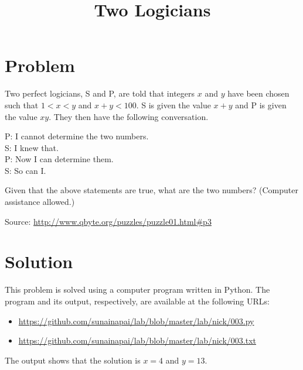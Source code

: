 \documentclass{article}
\title{Two Logicians}
\begin{document}
\maketitle

\section*{Problem}
Two perfect logicians, S and P, are told that integers \( x \) and \( y \)
have been chosen such that \( 1 < x < y \) and \( x + y < 100 \). S is
given the value \( x + y \) and P is given the value \( xy \). They then
have the following conversation.


\setlength{\leftskip}{2em}
P:  I cannot determine the two numbers. \\
S:  I knew that. \\
P:  Now I can determine them. \\
S:  So can I.

\setlength{\leftskip}{0em}

Given that the above statements are true, what are the two numbers?
(Computer assistance allowed.)

Source: \url{http://www.qbyte.org/puzzles/puzzle01.html#p3}

\section*{Solution}
This problem is solved using a computer program written in Python. The
program and its output, respectively, are available at the following
URLs:
\begin{itemize}
\item \url{https://github.com/sunainapai/lab/blob/master/lab/nick/003.py}
\item \url{https://github.com/sunainapai/lab/blob/master/lab/nick/003.txt}
\end{itemize}

The output shows that the solution is \( x = 4 \) and \( y = 13 \).
\end{document}
